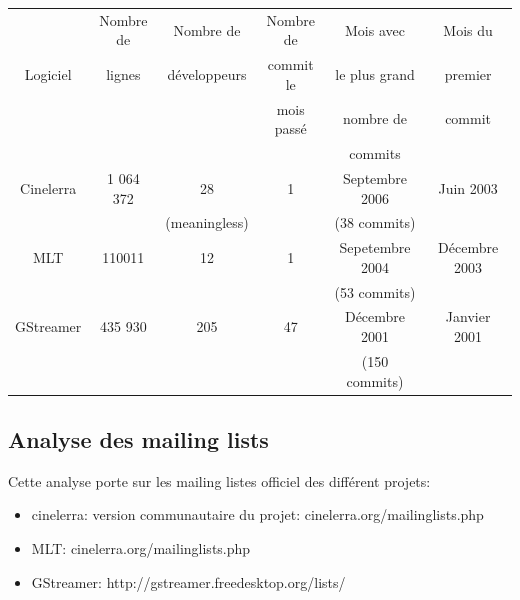\begin{center}

  \begin{tabular}{ | c | c | c | c |c| c |}

    \hline

         &Nombre de& Nombre de & Nombre de&Mois avec& Mois du \\

Logiciel &lignes & développeurs& commit le&le plus grand & premier\\

         &&&mois passé&nombre de&commit\\

         &&&&commits&\\

\hline \hline

Cinelerra&1 064 372 &28&1& Septembre 2006&Juin 2003\\

&&(meaningless)&&(38 commits)&\\ \hline

MLT& 110011 &12&1& Sepetembre 2004&Décembre 2003\\

&&&&(53 commits)& \\ \hline

GStreamer& 435 930  &205&47& Décembre 2001&Janvier 2001\\

&&&&(150 commits)& \\ \hline

  \end{tabular}

\end{center}


\subsection {Analyse des mailing lists}

Cette analyse porte sur les mailing listes officiel des différent
projets:

\begin{itemize}

  \item {cinelerra: version communautaire du projet:
    cinelerra.org/mailinglists.php}

  \item {MLT: cinelerra.org/mailinglists.php}

  \item {GStreamer: http://gstreamer.freedesktop.org/lists/}

\end{itemize}


